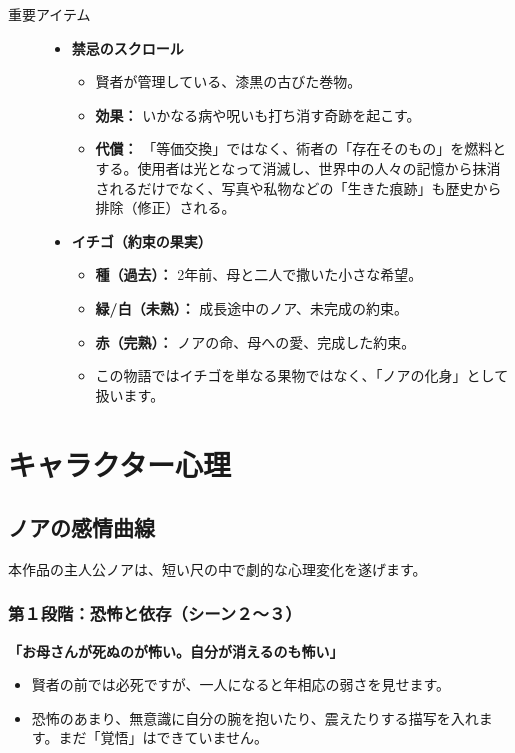 \begin{description}
    \item [重要アイテム]
    \begin{itemize}
        \item \textbf{禁忌のスクロール}
        \begin{itemize}
            \item 賢者が管理している、漆黒の古びた巻物。
            \item \textbf{効果：} いかなる病や呪いも打ち消す奇跡を起こす。
            \item \textbf{代償：} 「等価交換」ではなく、術者の「存在そのもの」を燃料とする。使用者は光となって消滅し、世界中の人々の記憶から抹消されるだけでなく、写真や私物などの「生きた痕跡」も歴史から排除（修正）される。
        \end{itemize}
        \item \textbf{イチゴ（約束の果実）}
        \begin{itemize}
            \item \textbf{種（過去）：} 2年前、母と二人で撒いた小さな希望。
            \item \textbf{緑/白（未熟）：} 成長途中のノア、未完成の約束。
            \item \textbf{赤（完熟）：} ノアの命、母への愛、完成した約束。
            \item この物語ではイチゴを単なる果物ではなく、「ノアの化身」として扱います。
        \end{itemize}
    \end{itemize}

\end{description}


\clearpage\section{キャラクター心理}

\subsection{ノアの感情曲線}
本作品の主人公ノアは、短い尺の中で劇的な心理変化を遂げます。%

\subsubsection{第１段階：恐怖と依存（シーン２〜３）}
\textbf{「お母さんが死ぬのが怖い。自分が消えるのも怖い」}
\begin{itemize}
    \item 賢者の前では必死ですが、一人になると年相応の弱さを見せます。
    \item 恐怖のあまり、無意識に自分の腕を抱いたり、震えたりする描写を入れます。まだ「覚悟」はできていません。
\end{itemize}

